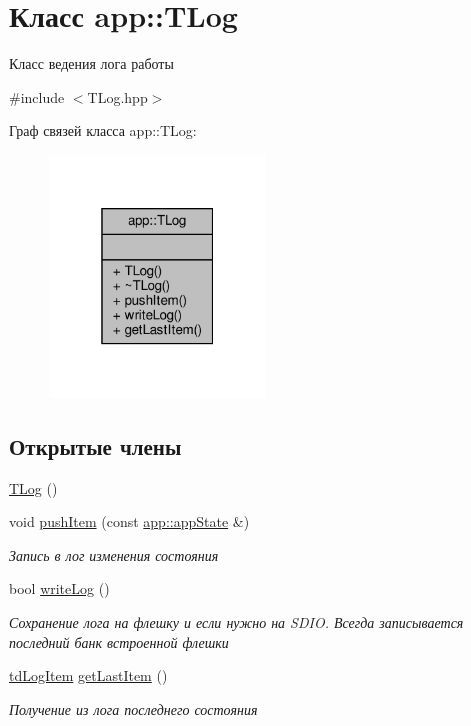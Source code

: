 \hypertarget{classapp_1_1_t_log}{}\section{Класс app\+:\+:T\+Log}
\label{classapp_1_1_t_log}


Класс ведения лога работы  




{\ttfamily \#include $<$T\+Log.\+hpp$>$}



Граф связей класса app\+:\+:T\+Log\+:\nopagebreak
\begin{figure}[H]
\begin{center}
\leavevmode
\includegraphics[width=163pt]{classapp_1_1_t_log__coll__graph}
\end{center}
\end{figure}
\subsection*{Открытые члены}
\begin{DoxyCompactItemize}
\item 
\hyperlink{classapp_1_1_t_log_a9f8a10a82504933ab909b90ea9413b65}{T\+Log} ()
\item 
void \hyperlink{classapp_1_1_t_log_a9632f9ff3d14bd24d6587f3509fbe9de}{push\+Item} (const \hyperlink{group___xD0_x9F_xD0_xB5_xD1_x80_xD0_xB5_xD1_x87_xD0_xB8_xD1_x81_xD0_xBB_xD0_xB5_xD0_xBD_xD0_xB8_xD1_x8F_ga290e8080c661e52c2f685fd4af148acf}{app\+::app\+State} \&)
\begin{DoxyCompactList}\small\item\em Запись в лог изменения состояния \end{DoxyCompactList}\item 
bool \hyperlink{classapp_1_1_t_log_aa28e5b94b906fcb2f8fed5f08b92e077}{write\+Log} ()
\begin{DoxyCompactList}\small\item\em Сохранение лога на флешку и если нужно на S\+D\+IO. Всегда записывается последний банк встроенной флешки \end{DoxyCompactList}\item 
\hyperlink{structapp_1_1td_log_item}{td\+Log\+Item} \hyperlink{classapp_1_1_t_log_a281a776bf33d2be787b907265e435683}{get\+Last\+Item} ()
\begin{DoxyCompactList}\small\item\em Получение из лога последнего состояния \end{DoxyCompactList}\end{DoxyCompactItemize}


